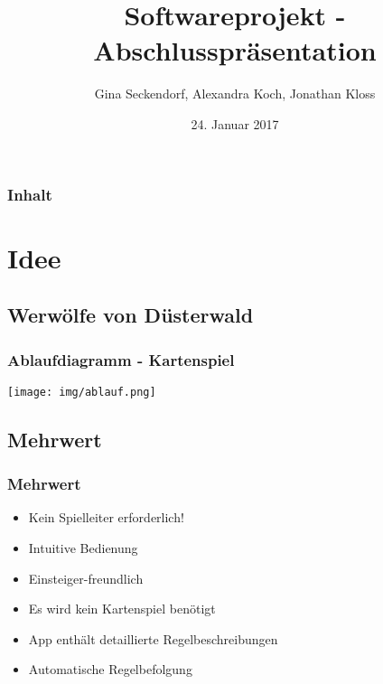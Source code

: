 \documentclass{beamer}
\title{Softwareprojekt - Abschlusspräsentation}
\author{Gina Seckendorf, Alexandra Koch, Jonathan Kloss}
\date{24. Januar 2017}
\begin{document}
\begin{frame}[plain]
 \titlepage
\end{frame}


\section[Agenda]{}
\begin{frame}
\frametitle{Inhalt}
\tableofcontents
\end{frame}


\section{Idee}

	\subsection{Werwölfe von Düsterwald}
\begin{frame}
\frametitle{Ablaufdiagramm - Kartenspiel}

\texttt{[image: img/ablauf.png]}
\end{frame}


	\subsection{Mehrwert}
\begin{frame}
\frametitle{Mehrwert}
\begin{itemize}
\item Kein Spielleiter erforderlich!
\item Intuitive Bedienung
\item Einsteiger-freundlich
\item Es wird kein Kartenspiel benötigt
\item App enthält detaillierte Regelbeschreibungen %
\item Automatische Regelbefolgung %
\end{itemize}
\end{frame}
\end{document}
